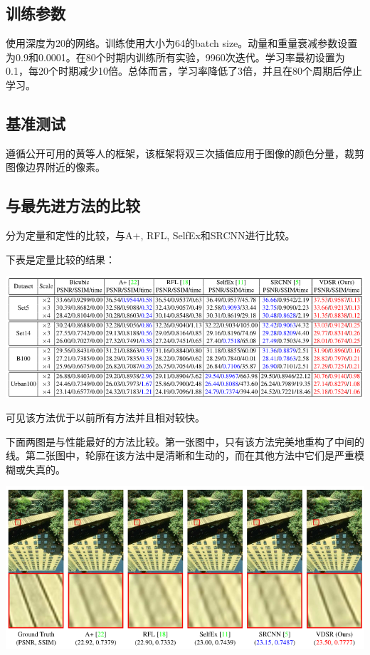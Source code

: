 \documentclass[UTF8,a4paper,10pt]{ctexrep}
\begin{document}
\subsection{训练参数}
使用深度为20的网络。训练使用大小为64的batch size。动量和重量衰减参数设置为0.9和0.0001。在80个时期内训练所有实验，9960次迭代。学习率最初设置为0.1，每20个时期减少10倍。总体而言，学习率降低了3倍，并且在80个周期后停止学习。

\subsection{基准测试}
遵循公开可用的黄等人的框架，该框架将双三次插值应用于图像的颜色分量，裁剪图像边界附近的像素。

\subsection{与最先进方法的比较}
分为定量和定性的比较，与A+, RFL, SelfEx和SRCNN进行比较。

下表是定量比较的结果：

\includegraphics[width=\textwidth]{figure/dingliang.png}

可见该方法优于以前所有方法并且相对较快。

下面两图是与性能最好的方法比较。第一张图中，只有该方法完美地重构了中间的线。第二张图中，轮廓在该方法中是清晰和生动的，而在其他方法中它们是严重模糊或失真的。

\includegraphics[width=\textwidth]{figure/6.png}
\end{document}
